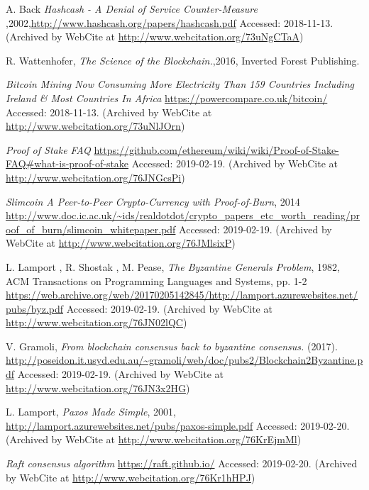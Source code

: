 \documentclass[final, 12pt,oneside]{class_diss}
\begin{document}
\begin{thebibliography}{10}
 A. Back \textit{Hashcash - A Denial of Service Counter-Measure
},2002,\url{http://www.hashcash.org/papers/hashcash.pdf} Accessed: 2018-11-13. (Archived by WebCite at \url{http://www.webcitation.org/73uNgCTaA})

R. Wattenhofer, \textit{The Science of the Blockchain.},2016, Inverted Forest Publishing.

 \textit{Bitcoin Mining Now Consuming More Electricity Than 159 Countries Including Ireland \& Most Countries In Africa} \url{https://powercompare.co.uk/bitcoin/} Accessed: 2018-11-13. (Archived by WebCite at \url{http://www.webcitation.org/73uNlJOrn})

 \textit{Proof of Stake FAQ} \url{https://github.com/ethereum/wiki/wiki/Proof-of-Stake-FAQ#what-is-proof-of-stake} Accessed: 2019-02-19. (Archived by WebCite at \url{http://www.webcitation.org/76JNGcsPi})

 \textit{Slimcoin
A Peer-to-Peer Crypto-Currency with Proof-of-Burn}, 2014  \url{http://www.doc.ic.ac.uk/~ids/realdotdot/crypto_papers_etc_worth_reading/proof_of_burn/slimcoin_whitepaper.pdf} Accessed: 2019-02-19. (Archived by WebCite at \url{http://www.webcitation.org/76JMlsixP})

L. Lamport , R. Shostak , M. Pease, \textit{The Byzantine Generals Problem}, 1982,  ACM Transactions on Programming Languages and Systems, pp. 1-2 \url{https://web.archive.org/web/20170205142845/http://lamport.azurewebsites.net/pubs/byz.pdf} Accessed: 2019-02-19. (Archived by WebCite at \url{http://www.webcitation.org/76JN02lQC})

V. Gramoli, \textit{From blockchain consensus back to byzantine consensus.} (2017).  
\url{http://poseidon.it.usyd.edu.au/~gramoli/web/doc/pubs2/Blockchain2Byzantine.pdf} Accessed: 2019-02-19. (Archived by WebCite at \url{http://www.webcitation.org/76JN3x2HG})

 L. Lamport, \textit{Paxos Made Simple}, 2001, \url{http://lamport.azurewebsites.net/pubs/paxos-simple.pdf} Accessed: 2019-02-20. (Archived by WebCite at \url{http://www.webcitation.org/76KrEjmMl})

 \textit{Raft consensus algorithm} \url{https://raft.github.io/} Accessed: 2019-02-20. (Archived by WebCite at \url{http://www.webcitation.org/76Kr1hHPJ})


\end{thebibliography}
\end{document}
